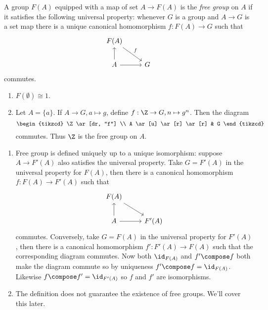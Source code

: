 \documentclass[a4paper]{article}
\begin{document}
\begin{definition}
  A group \(F(A)\) equipped with a map of set \(A \to F(A)\) is the \emph{free group} on \(A\) if it satisfies the following universal property: whenever \(G\) is a group and \(A \to G\) is a set map there is a unique canonical homomorphism \(f: F(A) \to G\) such that
  \[
    \begin{tikzcd}
      F(A) \ar[dr, "f"] \\
      A \ar[u] \ar[r] & G
    \end{tikzcd}
  \]
  commutes.
\end{definition}

\begin{eg}\leavevmode
  \begin{enumerate}
  \item \(F(\emptyset) \cong 1\).
  \item Let \(A = \{a\}\). If \(A \to G, a \mapsto g\), define \(f: \Z \to G, n \mapsto g^n\). Then the diagram
    \[
      \begin{tikzcd}
        \Z \ar[dr, "f"] \\
        A \ar[u] \ar[r] \ar[r] & G
      \end{tikzcd}
    \]
    commutes. Thus \(\Z\) is the free group on \(A\).
  \end{enumerate}
\end{eg}

\begin{remark}\leavevmode
  \begin{enumerate}
  \item Free group is defined uniquely up to a unique isomorphism: suppose \(A \to F'(A)\) also satisfies the universal property. Take \(G = F'(A)\) in the universal property for \(F(A)\), then there is a canonical homomorphism \(f: F(A) \to F'(A)\) such that
    \[
      \begin{tikzcd}
        F(A) \ar[dr] \\
        A \ar[u] \ar[r] & F'(A)
      \end{tikzcd}
    \]
    commutes. Conversely, take \(G = F(A)\) in the universal property for \(F'(A)\), then there is a canonical homomorphism \(f': F'(A) \to F(A)\) such that the corresponding diagram commutes. Now both \(\id_{F(A)}\) and \(f' \compose f\) both make the diagram commute so by uniqueness \(f' \compose f = \id_{F(A)}\). Likewise \(f \compose f' = \id_{F'(A)}\) so \(f\) and \(f'\) are isomorphisms.
  \item The definition does not guarantee the existence of free groups. We'll cover this later.
  \end{enumerate}
\end{remark}
\end{document}
